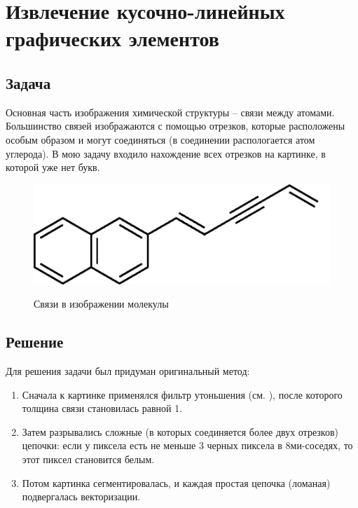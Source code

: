 \section{Извлечение кусочно-линейных графических элементов}
\subsection{Задача}
Основная часть изображения химической структуры -- связи между атомами. Большинство связей изображаются с помощью
отрезков, которые расположены особым образом и могут соединяться (в соединении распологается атом углерода). В мою 
задачу входило нахождение всех отрезков на картинке, в которой уже нет букв.

\begin{figure}[H]
\centering
{\includegraphics[scale=0.3, trim = 0mm 0mm 0mm 0mm, clip]{imgs/graphics}}
\caption{Связи в изображении молекулы}
\end{figure}


\subsection{Решение}
Для решения задачи был придуман оригинальный метод:

\begin{enumerate}
 \item Сначала к картинке применялся фильтр утоньшения (см. \cite{cychosz}), после которого 
       толщина связи становилась равной 1. 
 \item Затем разрывались сложные (в которых соединяется более двух отрезков) цепочки: если у 
       пиксела есть не меньше 3 черных пиксела 
       в 8ми-соседях, то этот пиксел становится белым.
 \item Потом картинка сегментировалась, и каждая простая цепочка (ломаная) подвергалась векторизации.
\end{enumerate}

